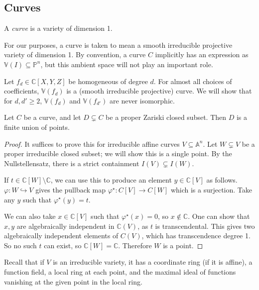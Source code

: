 \subsection{Curves}
\begin{definition}
    A \emph{curve} is a variety of dimension 1.
\end{definition}
For our purposes, a curve is taken to mean a smooth irreducible projective variety of dimension 1.
By convention, a curve \( C \) implicitly has an expression as \( \mathbb V(I) \subseteq \mathbb P^n \), but this ambient space will not play an important role.
\begin{example}
    Let \( f_d \in \mathbb C[X, Y, Z] \) be homogeneous of degree \( d \).
    For almost all choices of coefficients, \( \mathbb V(f_d) \) is a (smooth irreducible projective) curve.
    We will show that for \( d, d' \geq 2 \), \( \mathbb V(f_d) \) and \( \mathbb V(f_{d'}) \) are never isomorphic.
\end{example}
\begin{proposition}
    Let \( C \) be a curve, and let \( D \subsetneq C \) be a proper Zariski closed subset.
    Then \( D \) is a finite union of points.
\end{proposition}
\begin{proof}
    It suffices to prove this for irreducible affine curves \( V \subseteq \mathbb A^n \).
    Let \( W \subsetneq V \) be a proper irreducible closed subset; we will show this is a single point.
    By the Nullstellensatz, there is a strict containment \( I(V) \subsetneq I(W) \).

    If \( t \in \mathbb C[W] \setminus \mathbb C \), we can use this to produce an element \( y \in \mathbb C[V] \) as follows.
    \( \varphi \colon W \hookrightarrow V \) gives the pullback map \( \varphi^\star \colon C[V] \to C[W] \) which is a surjection.
    Take any \( y \) such that \( \varphi^\star(y) = t \).

    We can also take \( x \in \mathbb C[V] \) such that \( \varphi^\star(x) = 0 \), so \( x \not\in \mathbb C \).
    One can show that \( x, y \) are algebraically independent in \( \mathbb C(V) \), as \( t \) is transcendental.
    This gives two algebraically independent elements of \( C(V) \), which has transcendence degree 1.
    So no such \( t \) can exist, so \( \mathbb C[W] = \mathbb C \).
    Therefore \( W \) is a point.
\end{proof}
Recall that if \( V \) is an irreducible variety, it has a coordinate ring (if it is affine), a function field, a local ring at each point, and the maximal ideal of functions vanishing at the given point in the local ring.
